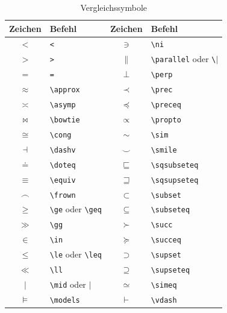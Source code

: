 \documentclass[a4paper,10pt,twoside]{scrbook}
\begin{document}
{\begin{table}[h!tb]
\centering
\caption{Vergleichssymbole}
\label{Tabelle_Vergleichssymbole}       %
\begin{tabular}{clcl}
\hline
Zeichen & Befehl & Zeichen & Befehl  \\
\hline
$<$ & \texttt{<} &
$\ni$ & \texttt{\textbackslash ni} \\
$>$ & \texttt{>} &
$\parallel$ & \texttt{\textbackslash parallel} oder \texttt{\textbackslash$|$} \\
$=$ & \texttt{=} &
$\perp$ & \texttt{\textbackslash perp} \\
$\approx$ & \texttt{\textbackslash approx} & 
$\prec$ & \texttt{\textbackslash prec} \\
$\asymp$ & \texttt{\textbackslash asymp} & 
$\preceq$ & \texttt{\textbackslash preceq} \\
$\bowtie$ & \texttt{\textbackslash bowtie} & 
$\propto$ & \texttt{\textbackslash propto} \\ 
$\cong$ & \texttt{\textbackslash cong} &
$\sim$ & \texttt{\textbackslash sim} \\
$\dashv$ & \texttt{\textbackslash dashv} & 
$\smile$ & \texttt{\textbackslash smile} \\
$\doteq$ & \texttt{\textbackslash doteq} & 
$\sqsubseteq$ & \texttt{\textbackslash sqsubseteq} \\
$\equiv$ & \texttt{\textbackslash equiv} & 
$\sqsupseteq$ & \texttt{\textbackslash sqsupseteq} \\
$\frown$ & \texttt{\textbackslash frown} & 
$\subset$ & \texttt{\textbackslash subset} \\  
$\geq$ & \texttt{\textbackslash ge} oder \texttt{\textbackslash geq} &
$\subseteq$ & \texttt{\textbackslash subseteq} \\
$\gg$ & \texttt{\textbackslash gg} & 
$\succ$ & \texttt{\textbackslash succ} \\
$\in$ & \texttt{\textbackslash in} & 
$\succeq$ & \texttt{\textbackslash succeq} \\
$\le$ & \texttt{\textbackslash le} oder \texttt{\textbackslash leq} & 
$\supset$ & \texttt{\textbackslash supset} \\
$\ll$ & \texttt{\textbackslash ll} & 
$\supseteq$ & \texttt{\textbackslash supseteq} \\
$\mid$ & \texttt{\textbackslash mid} oder \texttt{$|$} &
$\simeq$ & \texttt{\textbackslash simeq} \\
$\models$ & \texttt{\textbackslash models} & 
$\vdash$ & \texttt{\textbackslash vdash} \\
\hline
\end{tabular}
\end{table}


}
\end{document}
